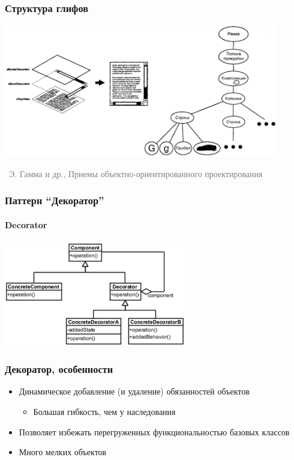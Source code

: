 \documentclass[xetex,mathserif,serif]{beamer}
\newcommand{\attribution}[1] {
    \vspace{-5mm}\begin{flushright}\begin{scriptsize}\textcolor{gray}{\textcopyright\, #1}\end{scriptsize}\end{flushright}
}
\begin{document}
    \begin{frame}
        \frametitle{Структура глифов}
        \begin{center}
            \includegraphics[width=0.9\textwidth]{glyphStructure.png}
            \attribution{Э. Гамма и др., Приемы объектно-ориентированного проектирования}
        \end{center}
    \end{frame}

    \begin{frame}
        \frametitle{Паттерн ``Декоратор''}
        \framesubtitle{Decorator}
        \begin{center}
            \includegraphics[width=0.6\textwidth]{decorator.png}
        \end{center}
    \end{frame}

    \begin{frame}
        \frametitle{Декоратор, особенности}
        \begin{itemize}
            \item Динамическое добавление (и удаление) обязанностей объектов
            \begin{itemize}
                \item Большая гибкость, чем у наследования
            \end{itemize}
            \item Позволяет избежать перегруженных функциональностью базовых классов
            \item Много мелких объектов
        \end{itemize}
    \end{frame}
\end{document}
